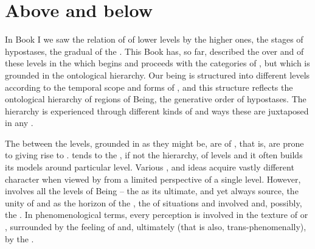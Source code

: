 \section{Above and below}
In Book I we saw the relation of  of lower levels by
the higher ones, the stages of hypostases, the gradual  of the
 .  This Book has, so far, described the
 over and of these levels in the  which
begins and proceeds with the categories of , but
which is grounded in the ontological hierarchy.  Our being is structured into
different levels according to the temporal scope and forms of , and
this structure reflects the ontological hierarchy of regions of Being, the
generative order of hypostases.  The hierarchy is experienced through different
kinds of  and ways these  are juxtaposed in any .


The  between the levels, grounded in  as they
might be, are  of , that is, are prone to giving
rise to .   tends to 
the , if not the hierarchy, of levels and it often builds its
models around particular level.  Various ,  and ideas
acquire vastly different character when viewed by  from a limited
perspective of a single level.
However,  involves all the levels of Being -- the  as
its ultimate,  and  yet always  source, the
unity of  and  as the horizon of the , the 
 of  situations and involved  and,
possibly, the  .  In phenomenological terms, every
 perception is involved in the texture of   or
, surrounded by the feeling of  and, ultimately (that
is also, trans-phenomenally), by the  .

